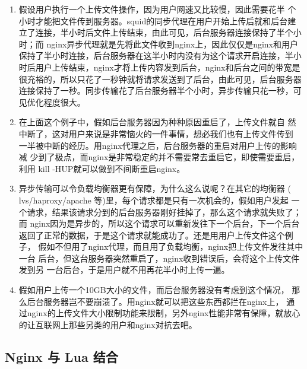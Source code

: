 \begin{enumerate}[itemsep=0pt,parsep=0pt]
\item 假设用户执行一个上传文件操作，因为用户网速又比较慢，因此需要花半
  个小时才能把文件传到服务器。squid的同步代理在用户开始上传后就和后台建
  立了连接，半小时后文件上传结束，由此可见，后台服务器连接保持了半个小
  时；而 nginx异步代理就是先将此文件收到nginx上，因此仅仅是nginx和用户
  保持了半小时连接，后台服务器在这半小时内没有为这个请求开启连接，半小
  时后用户上传结束，nginx才将上传内容发到后台，nginx和后台之间的带宽是
  很充裕的，所以只花了一秒钟就将请求发送到了后台，由此可见，后台服务器
  连接保持了一秒。同步传输花了后台服务器半个小时，异步传输只花一秒，可
  见优化程度很大。

\item 在上面这个例子中，假如后台服务器因为种种原因重启了，上传文件就自
  然中断了，这对用户来说是非常恼火的一件事情，想必我们也有上传文件传到
  一半被中断的经历。用nginx代理之后，后台服务器的重启对用户上传的影响减
  少到了极点，而nginx是非常稳定的并不需要常去重启它，即使需要重启，利用
  kill -HUP就可以做到不间断重启nginx。

\item 异步传输可以令负载均衡器更有保障，为什么这么说呢？在其它的均衡器
  ( lvs/haproxy/apache 等)里，每个请求都是只有一次机会的，假如用户发起
  一个请求，结果该请求分到的后台服务器刚好挂掉了，那么这个请求就失败了；
  而 nginx因为是异步的，所以这个请求可以重新发往下一个后台，下一个后台
  返回了正常的数据，于是这个请求就能成功了。还是用用户上传文件这个例子，
  假如不但用了nginx代理，而且用了负载均衡，nginx把上传文件发往其中一台
  后台，但这台服务器突然重启了，nginx收到错误后，会将这个上传文件发到另
  一台后台，于是用户就不用再花半小时上传一遍。

\item 假如用户上传一个10GB大小的文件，而后台服务器没有考虑到这个情况，
  那么后台服务器岂不要崩溃了。用nginx就可以把这些东西都拦在nginx上， 通
  过nginx的上传文件大小限制功能来限制，另外nginx性能非常有保障，就放心
  的让互联网上那些另类的用户和nginx对抗去吧。
\end{enumerate}

\subsection{Nginx 与 Lua 结合}

